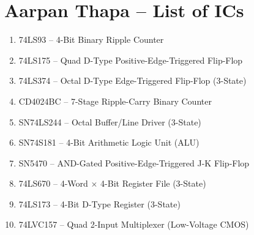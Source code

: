 \documentclass[12pt,a4paper]{report}
\begin{document}
\section*{Aarpan Thapa -- List of ICs}
\begin{enumerate}
  \item 74LS93 -- 4-Bit Binary Ripple Counter
  \item 74LS175 -- Quad D-Type Positive-Edge-Triggered Flip-Flop
  \item 74LS374 -- Octal D-Type Edge-Triggered Flip-Flop (3-State)
  \item CD4024BC -- 7-Stage Ripple-Carry Binary Counter
  \item SN74LS244 -- Octal Buffer/Line Driver (3-State)
  \item SN74S181 -- 4-Bit Arithmetic Logic Unit (ALU)
  \item SN5470 -- AND-Gated Positive-Edge-Triggered J-K Flip-Flop
  \item 74LS670 -- 4-Word $\times$ 4-Bit Register File (3-State)
  \item 74LS173 -- 4-Bit D-Type Register (3-State)
  \item 74LVC157 -- Quad 2-Input Multiplexer (Low-Voltage CMOS)
\end{enumerate}
\end{document}
